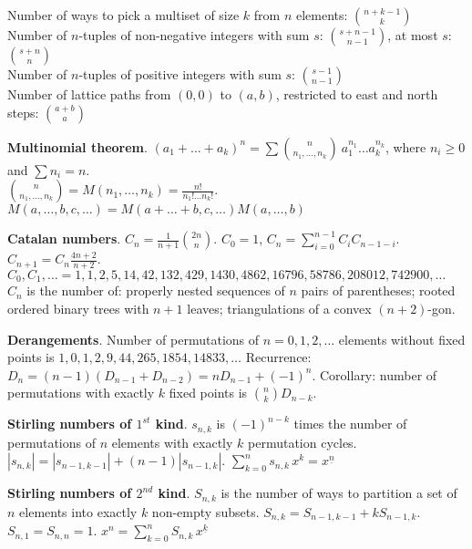 \documentclass[a4paper, 12pt]{article}
\let\le=\leqslant
\let\ge=\geqslant
\newcommand{\Topic}[1]{\textbf{#1}}
\begin{document}
Number of ways to pick a multiset of size $k$ from $n$ elements: ${n+k-1 \choose k}$ \\
Number of $n$-tuples of non-negative integers with sum $s$:
${{s+n-1} \choose {n-1}}$, at most $s$: ${{s + n} \choose {n}}$ \\
Number of $n$-tuples of positive integers with sum $s$:
${{s-1} \choose {n-1}}$ \\
Number of lattice paths from $(0,0)$ to $(a,b)$, restricted to east and north
steps: ${a+b \choose a}$

\Topic{Multinomial theorem}.
$(a_1+\dots+a_k)^n = \sum {n \choose n_1,\dots,n_k}\ 
a_1^{n_1} \dots a_k^{n_k}$,
where $n_i \ge 0$ and $\sum n_i=n$. \\
${n \choose n_1,\dots,n_k} = M(n_1,\dots,n_k) = \frac{n!}{n_1! \dots n_k!}$.
$M(a,\dots,b,c,\dots) = M(a+\dots+b,c,\dots) M(a,\dots,b)$

\Topic{Catalan numbers}.
$C_n = \frac{1}{n+1} {2n \choose n}$.
\quad $C_0=1$, $C_n=\sum_{i=0}^{n-1} C_i C_{n-1-i}$.
\quad $C_{n+1} = C_n \frac{4n+2}{n+2}$. \\
$C_0, C_1, \ldots = 1, 1, 2, 5, 14, 42, 132, 429, 1430, 4862, 16796,
	58786, 208012, 742900, \ldots$ \\
$C_n$ is the number of:
properly nested sequences of $n$ pairs of parentheses;
rooted ordered binary trees with $n+1$ leaves;
triangulations of a convex $(n+2)$-gon.

\Topic{Derangements}.
Number of permutations of $n=0,1,2,\dots$ elements without fixed points is
$1, 0, 1, 2, 9, 44, 265, 1854, 14833, \dots$
Recurrence: $D_n = (n-1)(D_{n-1} + D_{n-2}) = n D_{n-1} + (-1)^n$.
Corollary: number of permutations with exactly $k$ fixed points is ${n \choose k} D_{n-k}$.

\Topic{Stirling numbers of $1^{st}$ kind}.
$s_{n,k}$ is $(-1)^{n-k}$ times the number of permutations of $n$ elements with
exactly $k$ permutation cycles.
$|s_{n,k}| = |s_{n-1,k-1}| + (n-1) |s_{n-1,k}|$. \quad
$\sum_{k=0}^n s_{n,k}\,x^k = x^{\underline n}$


\Topic{Stirling numbers of $2^{nd}$ kind}.
$S_{n,k}$ is the number of ways to partition a set of $n$ elements into
exactly $k$ non-empty subsets. 
$S_{n,k} = S_{n-1,k-1} + k S_{n-1,k}$.
$S_{n,1} = S_{n,n} = 1$.
$x^n = \sum_{k=0}^n S_{n,k}\,x^{\underline k}$
\end{document}

